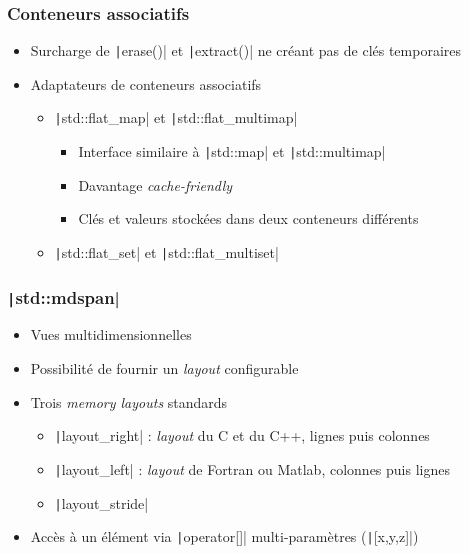 \documentclass[C++.tex]{subfiles}
\begin{document}
\begin{frame}[fragile]
	\frametitle{Conteneurs associatifs}
	\begin{itemize}
		\item Surcharge de \texttt|erase()| et \texttt|extract()| ne créant pas de clés temporaires
		\item Adaptateurs de conteneurs associatifs
		\begin{itemize}
			\item \texttt|std::flat_map| et \texttt|std::flat_multimap|
			\begin{itemize}
				\item Interface similaire à \texttt|std::map| et \texttt|std::multimap|
				\item Davantage \textit{cache-friendly}
				\item Clés et valeurs stockées dans deux conteneurs différents
			\end{itemize}
			\item \texttt|std::flat_set| et \texttt|std::flat_multiset|
		\end{itemize}
	\end{itemize}
\end{frame}

\begin{frame}[fragile]
	\frametitle{\texttt|std::mdspan|}
	\begin{itemize}
		\item Vues multidimensionnelles
		\item Possibilité de fournir un \textit{layout} configurable
		\item Trois \textit{memory layouts} standards
		\begin{itemize}
			\item \texttt|layout_right| : \textit{layout} du C et du C++, lignes puis colonnes
			\item \texttt|layout_left| : \textit{layout} de Fortran ou Matlab, colonnes puis lignes
			\item \texttt|layout_stride| 
		\end{itemize}
		\item Accès à un élément via \texttt|operator[]| multi-paramètres (\texttt|[x,y,z]|)
	\end{itemize}
\end{frame}
\end{document}
